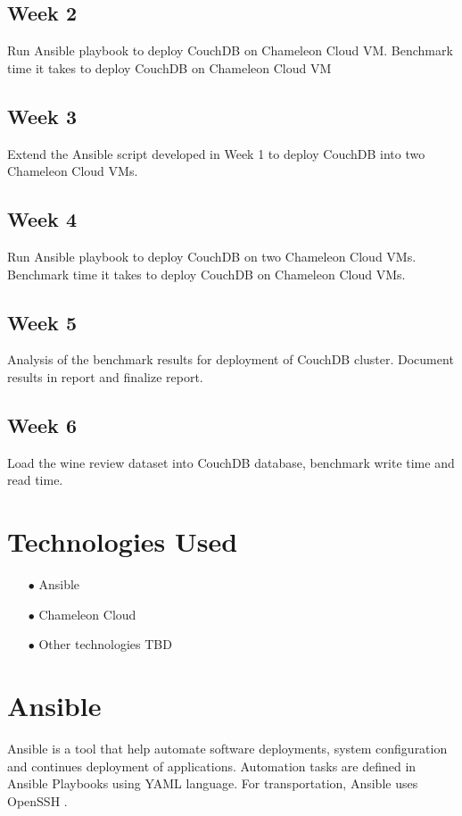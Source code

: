 \subsection{Week 2}

Run Ansible playbook to deploy CouchDB on Chameleon Cloud
VM. Benchmark time it takes to deploy CouchDB on Chameleon Cloud VM

\subsection{Week 3}

Extend the Ansible script developed in Week 1 to deploy CouchDB into
two Chameleon Cloud VMs.

\subsection{Week 4}

Run Ansible playbook to deploy CouchDB on two Chameleon Cloud
VMs. Benchmark time it takes to deploy CouchDB on Chameleon Cloud VMs.

\subsection{Week 5}

Analysis of the benchmark results for deployment of CouchDB
cluster. Document results in report and finalize report.

\subsection{Week 6}

Load the wine review dataset into CouchDB database, benchmark write time
and read time. 



\section{Technologies Used}

\begin{itemize}
\item[$\bullet$] Ansible
\item[$\bullet$] Chameleon Cloud
\item[$\bullet$] Other technologies TBD
\end{itemize}
\section{Ansible}
Ansible is a tool that help automate software deployments, system
configuration and continues deployment of applications. Automation
tasks are defined in Ansible Playbooks using YAML language. For
transportation, Ansible uses OpenSSH \cite{www-Ansible}. 

